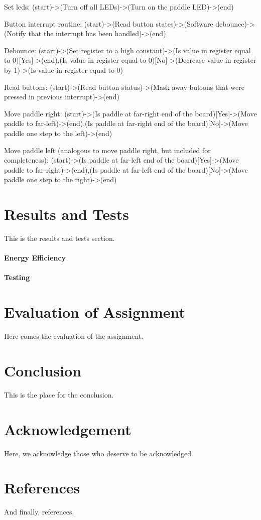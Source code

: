 \documentclass{article}
\begin{document}
Set leds:
(start)->(Turn off all LEDs)->(Turn on the paddle LED)->(end)

Button interrupt routine:
(start)->(Read button states)->(Software debounce)->(Notify that the interrupt has been handled)->(end)

Debounce:
(start)->(Set register to a high constant)->(Is value in register equal to 0)[Yes]->(end),(Is value in register equal to 0)[No]->(Decrease value in register by 1)->(Is value in register equal to 0)

Read buttons:
(start)->(Read button status)->(Mask away buttons that were pressed in previous interrupt)->(end)

Move paddle right:
(start)->(Is paddle at far-right end of the board)[Yes]->(Move paddle to far-left)->(end),(Is paddle at far-right end of the board)[No]->(Move paddle one step to the left)->(end)

Move paddle left (analogous to move paddle right, but included for completeness):
(start)->(Is paddle at far-left end of the board)[Yes]->(Move paddle to far-right)->(end),(Is paddle at far-left end of the board)[No]->(Move paddle one step to the right)->(end)




\part{Results and Tests}

This is the results and tests section.

\subsection{Energy Efficiency}

\subsection{Testing}

\part{Evaluation of Assignment}

Here comes the evaluation of the assignment.

\part{Conclusion}

This is the place for the conclusion.

\part{Acknowledgement}

Here, we acknowledge those who deserve to be acknowledged.

\part{References}

And finally, references.
\end{document}
